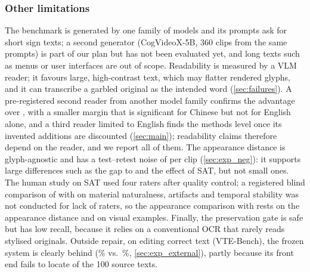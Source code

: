 \subsubsection{Other limitations}
The benchmark is generated by one family of models and its prompts ask for short sign texts; a second generator (CogVideoX-5B, 360 clips from the same prompts) is part of our plan but has not been evaluated yet, and long texts such as menus or user interfaces are out of scope. Readability is measured by a VLM reader; it favours large, high-contrast text, which may flatter rendered glyphs, and it can transcribe a garbled original as the intended word (\cref{sec:failures}). A pre-registered second reader from another model family confirms the advantage over \steer, with a smaller margin that is significant for Chinese but not for English alone, and a third reader limited to English finds the methods level once its invented additions are discounted (\cref{sec:main}); readability claims therefore depend on the reader, and we report all of them. The appearance distance is glyph-agnostic and has a test--retest noise of \rRetestSD{} per clip (\cref{sec:exp_neg}): it supports large differences such as the gap to \steer and the effect of SAT, but not small ones. The human study on SAT used four raters after quality control; a registered blind comparison of \method with \steer on material naturalness, artifacts and temporal stability was not conducted for lack of raters, so the appearance comparison with \steer rests on the appearance distance and on visual examples. Finally, the preservation gate is safe but has low recall, because it relies on a conventional OCR that rarely reads stylised originals. Outside repair, on editing correct text (VTE-Bench), the frozen system is clearly behind \steer (\xVteOurs\% vs.\ \xVteSteer\%, \cref{sec:exp_external}), partly because its front end fails to locate \xVteFails{} of the 100 source texts.
